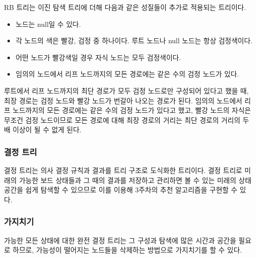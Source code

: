RB 트리는 이진 탐색 트리에 더해 다음과 같은 성질들이 추가로 적용되는 트리이다.\cite[pp. 308-309]{CLRS}
\begin{itemize}
    \item 노드는 null일 수 있다.
    \item 각 노드의 색은 빨강, 검정 중 하나이다. 루트 노드나 null 노드는 항상 검정색이다.
    \item 어떤 노드가 빨강색일 경우 자식 노드는 모두 검정색이다.
    \item 임의의 노드에서 리프 노드까지의 모든 경로에는 같은 수의 검정 노드가 있다.
\end{itemize}
루트에서 리프 노드까지의 최단 경로가 모두 검정 노드로만 구성되어 있다고 했을 때, 최장 경로는 검정 노드와 빨강 노드가 번갈아 나오는 경로가 된다.
임의의 노드에서 리프 노드까지의 모든 경로에는 같은 수의 검정 노드가 있다고 했고, 빨강 노드의 자식은 무조건 검정 노드이므로
모든 경로에 대해 최장 경로의 거리는 최단 경로의 거리의 두 배 이상이 될 수 없게 된다.

\subsubsection{결정 트리} 결정 트리는 의사 결정 규칙과 결과를 트리 구조로 도식화한 트리이다. 결정 트리로 미래의 가능한 보드 상태들과 그 때의 결과를 저장하고 관리하면
볼 수 있는 미래의 상태 공간을 쉽게 탐색할 수 있으므로 이를 이용해 3주차의 추천 알고리즘을 구현할 수 있다.

\subsubsection{가지치기} 가능한 모든 상태에 대한 완전 결정 트리는 그 구성과 탐색에 많은 시간과 공간을 필요로 하므로, 가능성이 떨어지는 노드들을 삭제하는 방법으로 가지치기를
할 수 있다.

